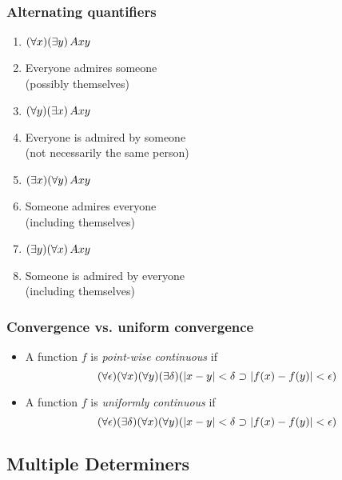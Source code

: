 \begin{frame}
    \frametitle{Alternating quantifiers}

\begin{enumerate}[<+->]
  \item $(\forall x) (\exists y) \, Axy$
  \item<2->[] Everyone admires someone\\
    (possibly themselves)
  \item $(\forall y) (\exists x) \, Axy$
  \item<3->[] Everyone is admired by someone\\
  (not necessarily the same person)
  \item $(\exists x) (\forall y) \, Axy$
  \item<4->[] Someone admires everyone\\
  (including themselves)
  \item $(\exists y) (\forall x) \, Axy$
  \item<5->[] Someone is admired by everyone\\
    (including themselves)
\end{enumerate}

\end{frame}

\begin{frame}
    \frametitle{Convergence vs. uniform convergence}

\begin{itemize}[<+->]
\item A function $f$ is \emph{point-wise continuous} if
\[
(\forall \epsilon)(\forall x)(\forall y)(\exists \delta)(\left|x - y\right| < \delta \supset \left|f(x) - f(y)\right| < \epsilon)
\]
\item A function $f$ is \emph{uniformly continuous} if
\[
(\forall \epsilon) (\exists \delta) (\forall x)(\forall y)(\left|x - y\right| < \delta \supset \left|f(x) - f(y)\right| < \epsilon)
\]
\end{itemize}

\end{frame}

\subsection{Multiple Determiners}

